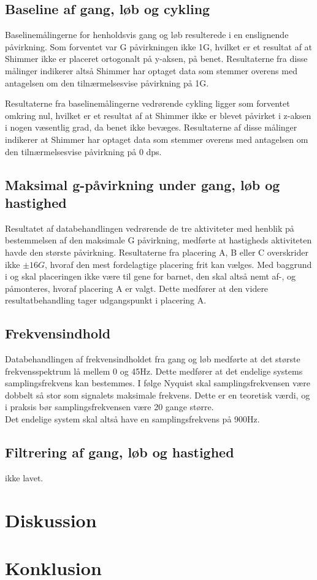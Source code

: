 \subsection{Baseline af gang, løb og cykling}
Baselinemålingerne for henholdsvis gang og løb resulterede i en enslignende påvirkning. Som forventet var G påvirkningen ikke 1G, hvilket er et resultat af at Shimmer ikke er placeret ortogonalt på y-aksen, på benet. Resultaterne fra disse målinger indikerer altså Shimmer har optaget data som stemmer overens med antagelsen om den tilnærmelsesvise påvirkning på 1G. 

Resultaterne fra baselinemålingerne vedrørende cykling ligger som forventet omkring nul, hvilket er et resultat af at Shimmer ikke er blevet påvirket i z-aksen i nogen væsentlig grad, da benet ikke bevæges. Resultaterne af disse målinger indikerer at Shimmer har optaget data som stemmer overens med antagelsen om den tilnærmelsesvise påvirkning på 0 dps. 

\subsection{Maksimal g-påvirkning under gang, løb og hastighed} \label{app:maxg}
Resultatet af databehandlingen vedrørende de tre aktiviteter med henblik på bestemmelsen af den maksimale G påvirkning, medførte at hastigheds aktiviteten havde den største påvirkning. Resultaterne fra placering A, B eller C overskrider ikke $\pm 16G$, hvoraf den mest fordelagtige placering frit kan vælges. Med baggrund i  og  skal placeringen ikke være til gene for barnet, den skal altså nemt af-, og påmonteres, hvoraf placering A er valgt. Dette medfører at den videre resultatbehandling tager udgangspunkt i placering A. 

\subsection{Frekvensindhold}
Databehandlingen af frekvensindholdet fra gang og løb medførte at det største frekvensspektrum lå mellem 0 og 45Hz. Dette medfører at det endelige systems samplingsfrekvens kan bestemmes. I følge Nyquist skal samplingsfrekvensen være dobbelt så stor som signalets maksimale frekvens. Dette er en teoretisk værdi, og i praksis bør samplingsfrekvensen være 20 gange større. \\
Det endelige system skal altså have en samplingsfrekvens på 900Hz.

\subsection{Filtrering af gang, løb og hastighed}
ikke lavet. 
\section{Diskussion}

\section{Konklusion}

